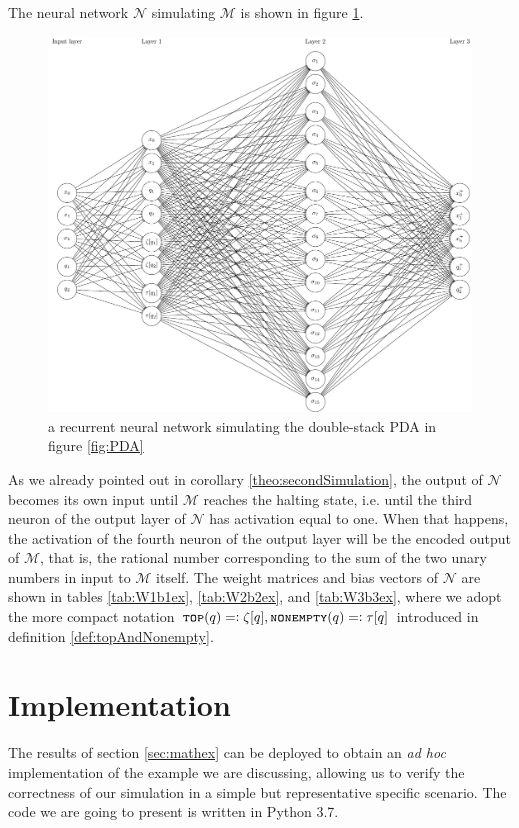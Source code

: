 \documentclass{book}
\newcommand{\eqdef}{=\vcentcolon}
\newcommand{\nonempty}{\textsc{\texttt{nonempty}}}
\newcommand{\tos}{\textsc{\texttt{top}}}
\theoremstyle{definition}
\theoremstyle{plain}
\theoremstyle{plain}
\theoremstyle{remark}
\theoremstyle{plain}
\begin{document}
	The neural network $\mathcal{N}$ simulating $\mathcal{M}$ is shown in figure \ref{fig:exampleNet}. 
	\begin{figure}
		\centering
		\includegraphics[width=.8\textwidth]{exampleNet.pdf}
		\caption{a recurrent neural network simulating the double-stack PDA in figure \ref{fig:PDA}}
		\label{fig:exampleNet}
	\end{figure}
	As we already pointed out in corollary \ref{theo:secondSimulation}, the output of $\mathcal{N}$ becomes its own input until $\mathcal{M}$ reaches the halting state, i.e. until the third neuron of the output layer of $\mathcal{N}$ has activation equal to one. When that happens, the activation of the fourth neuron of the output layer will be the encoded output of $\mathcal{M}$, that is, the rational number corresponding to the sum of the two unary numbers in input to $\mathcal{M}$ itself. The weight matrices and bias vectors of $\mathcal{N}$ are shown in tables \ref{tab:W1b1ex}, \ref{tab:W2b2ex}, and \ref{tab:W3b3ex}, where we adopt the more compact notation $\tos(q)\eqdef\zeta[q], \nonempty(q)\eqdef\tau[q]$ introduced in definition \ref{def:topAndNonempty}.
	
	
	
	
	\section{Implementation}
	The results of section \ref{sec:mathex} can be deployed to obtain an \emph{ad hoc} implementation of the example we are discussing, allowing us to verify the correctness of our simulation in a simple but representative specific scenario. The code we are going to present is written in Python 3.7. 
	
\end{document}
